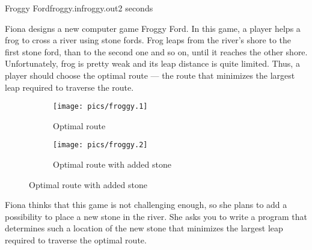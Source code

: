 \begin{problem}{Froggy Ford}{froggy.in}{froggy.out}{2 seconds}


Fiona designs a new computer game Froggy Ford. In this game, 
a player helps a frog to cross a river using stone fords. 
Frog leaps from the river's shore to the first stone ford, 
than to the second one and so on, until it reaches the other shore.
Unfortunately, frog is pretty weak and its leap distance is
quite limited. Thus, a player should choose the optimal route --- 
the route that minimizes the largest leap required to traverse the route.

%
%
\begin{figure}[h!]
\centering
\begin{subfigure}{0.5\textwidth}
  \centering
  \texttt{[image: pics/froggy.1]}
  \caption*{Optimal route}
\end{subfigure}%
\begin{subfigure}{0.5\textwidth}
  \centering
%
  \texttt{[image: pics/froggy.2]}
  \caption*{Optimal route with added stone}
\end{subfigure}%
\end{figure}

Fiona thinks that this game is not challenging enough, so she plans
to add a possibility to place a new stone in the river. She asks you
to write a program that determines such a location of the new stone that
minimizes the largest leap required to traverse the optimal route.


\end{problem}
